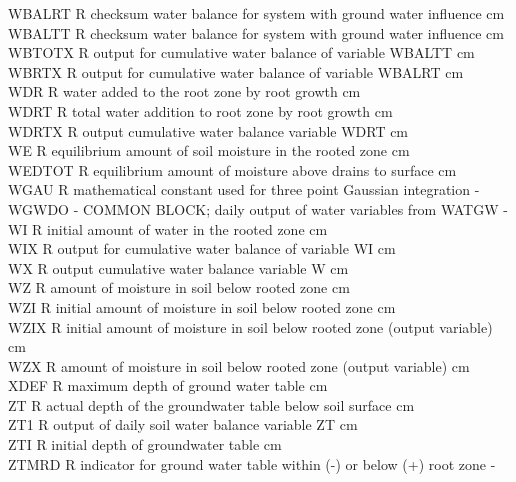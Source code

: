 \begin{tabbing}
WBALRT\> \> R\> checksum water balance for system with ground water influence\> \> \> \> \> \> \> cm\\
WBALTT\> \> R\> checksum water balance for system with ground water influence\> \> \> \> \> \> \> cm\\
WBTOTX\> \> R\> output for cumulative water balance of variable WBALTT\> \> \> \> \> \> \> cm\\
WBRTX\> \> R\> output for cumulative water balance of variable WBALRT\> \> \> \> \> \> \> cm\\
WDR\> \> R\> water added to the root zone by root growth\> \> \> \> \> \> \> cm\\
WDRT\> \> R\> total water addition to root zone by root growth\> \> \> \> \> \> \> cm\\
WDRTX\> \> R\> output cumulative water balance variable WDRT\> \> \> \> \> \> \> cm\\
WE\> \> R\> equilibrium amount of soil moisture in the rooted zone\> \> \> \> \> \> \> cm\\
WEDTOT\> \> R\> equilibrium amount of moisture above drains to surface\> \> \> \> \> \> \> cm\\
WGAU\> \> R\> mathematical constant used for three point Gaussian integration\> \> \> \> \> \> \> -\\
WGWDO\> \> -\> COMMON BLOCK; daily output of water variables from WATGW\> \> \> \> \> \> \> -\\
WI\> \> R\> initial amount of water in the rooted zone\> \> \> \> \> \> \> cm\\
WIX\> \> R\> output for cumulative water balance of variable WI\> \> \> \> \> \> \> cm\\
WX\> \> R\> output cumulative water balance variable W\> \> \> \> \> \> \> cm\\
WZ\> \> R\> amount of moisture in soil below rooted zone\> \> \> \> \> \> \> cm\\
WZI\> \> R\> initial amount of moisture in soil below rooted zone\> \> \> \> \> \> \> cm\\
WZIX\> \> R\> initial amount of moisture in soil below rooted zone (output variable)\> \> \> \> \> \> \> cm\\
WZX\> \> R\> amount of moisture in soil below rooted zone (output variable)\> \> \> \> \> \> \> cm\\
XDEF\> \> R\> maximum depth of ground water table\> \> \> \> \> \> \> cm\\
ZT\> \> R\> actual depth of the groundwater table below soil surface\> \> \> \> \> \> \> cm\\
ZT1\> \> R\> output of daily soil water balance variable ZT\> \> \> \> \> \> \> cm\\
ZTI\> \> R\> initial depth of groundwater table\> \> \> \> \> \> \> cm\\
ZTMRD\> \> R\> indicator for ground water table within (-) or below (+) root zone\> \> \> \> \> \> \> -
\end{tabbing}

